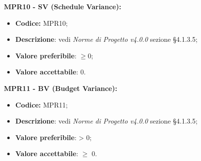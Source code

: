 \textbf{MPR10 - SV (Schedule Variance):}
\begin{itemize}
    \item \textbf{Codice:} MPR10;
    \item \textbf{Descrizione}: vedi \textit{Norme di Progetto v4.0.0} sezione \S 4.1.3.5;
    \item \textbf{Valore preferibile}: $\geq 0$;
    \item \textbf{Valore accettabile}: 0.
\end{itemize}
\textbf{MPR11 - BV (Budget Variance):}
\begin{itemize}
    \item \textbf{Codice:} MPR11;
    \item \textbf{Descrizione}: vedi \textit{Norme di Progetto v4.0.0} sezione \S 4.1.3.5;
    \item \textbf{Valore preferibile}: > 0;
    \item \textbf{Valore accettabile}: $\geq$ 0.
\end{itemize}
\newpage
